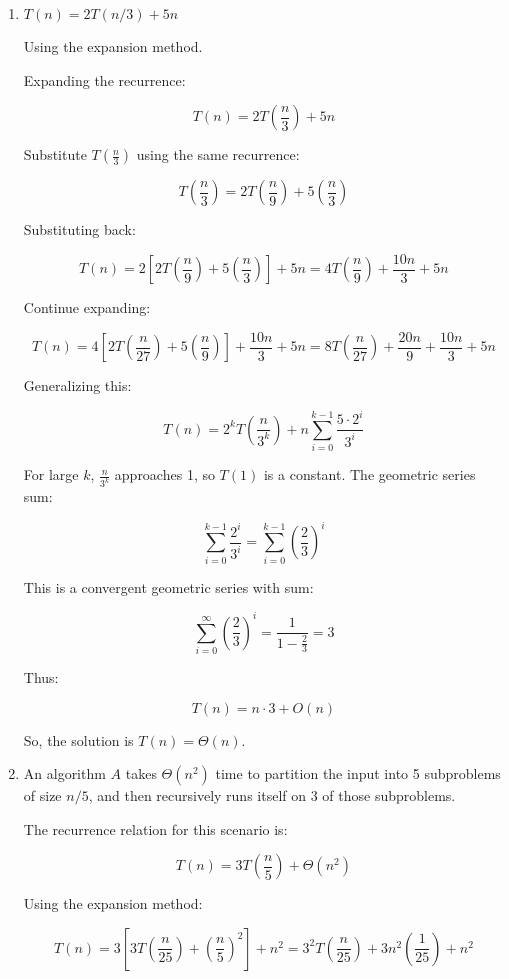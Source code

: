 \documentclass[11pt]{article}
\newenvironment{qparts}{\begin{enumerate}[{(}a{)}]}{\end{enumerate}}
\begin{document}
\begin{qparts}
        
\item 
\( T(n) = 2T(n/3) + 5n \)

Using the expansion method.

Expanding the recurrence:

\[
T(n) = 2T\left(\frac{n}{3}\right) + 5n
\]

Substitute \( T\left(\frac{n}{3}\right) \) using the same recurrence:

\[
T\left(\frac{n}{3}\right) = 2T\left(\frac{n}{9}\right) + 5\left(\frac{n}{3}\right)
\]

Substituting back:

\[
T(n) = 2\left[2T\left(\frac{n}{9}\right) + 5\left(\frac{n}{3}\right)\right] + 5n = 4T\left(\frac{n}{9}\right) + \frac{10n}{3} + 5n
\]

Continue expanding:

\[
T(n) = 4\left[2T\left(\frac{n}{27}\right) + 5\left(\frac{n}{9}\right)\right] + \frac{10n}{3} + 5n = 8T\left(\frac{n}{27}\right) + \frac{20n}{9} + \frac{10n}{3} + 5n
\]

Generalizing this:

\[
T(n) = 2^k T\left(\frac{n}{3^k}\right) + n\sum_{i=0}^{k-1} \frac{5 \cdot 2^i}{3^i}
\]

For large \( k \), \( \frac{n}{3^k} \) approaches 1, so \( T(1) \) is a constant. The geometric series sum:

\[
\sum_{i=0}^{k-1} \frac{2^i}{3^i} = \sum_{i=0}^{k-1} \left(\frac{2}{3}\right)^i
\]

This is a convergent geometric series with sum:

\[
\sum_{i=0}^{\infty} \left(\frac{2}{3}\right)^i = \frac{1}{1-\frac{2}{3}} = 3
\]

Thus:

\[
T(n) = n \cdot 3 + O(n)
\]

So, the solution is \( T(n) = \Theta(n) \).

\item 
 An algorithm \( A \) takes \( \Theta(n^2) \) time to partition the input into 5 subproblems of size \( n/5 \), and then recursively runs itself on 3 of those subproblems.

The recurrence relation for this scenario is:

\[
T(n) = 3T\left(\frac{n}{5}\right) + \Theta(n^2)
\]

Using the expansion method:

\[
T(n) = 3\left[3T\left(\frac{n}{25}\right) + \left(\frac{n}{5}\right)^2\right] + n^2 = 3^2T\left(\frac{n}{25}\right) + 3n^2\left(\frac{1}{25}\right) + n^2
\]


\end{qparts}
\end{document}
